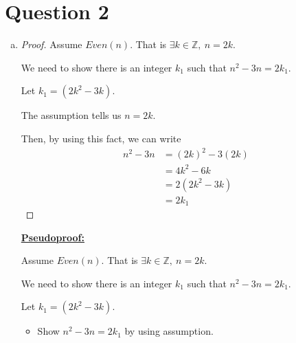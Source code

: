 \documentclass[12pt]{article}
\begin{document}
\section*{Question 2}
\begin{enumerate}[a.]
    \item

    \begin{proof}
        \bigskip

        Assume $Even(n)$. That is $\exists k \in \mathbb{Z},\:n = 2k$.

        \bigskip

        We need to show there is an integer $k_1$ such that $n^2 - 3n = 2k_1$.

        \bigskip

        Let $k_1 = (2k^2 - 3k)$.

        \bigskip

        The assumption tells us $n = 2k$.

        \bigskip

        Then, by using this fact, we can write
        \setcounter{equation}{0}
        \begin{align}
            n^2 - 3n &= (2k)^2 - 3(2k)\\
            &= 4k^2 - 6k\\
            &= 2(2k^2 - 3k)\\
            &= 2k_1
        \end{align}

    \end{proof}

    \bigskip

    \begin{mdframed}
        \underline{\textbf{Pseudoproof:}}

        \bigskip

        Assume $Even(n)$. That is $\exists k \in \mathbb{Z},\:n = 2k$.

        \bigskip

        We need to show there is an integer $k_1$ such that $n^2 - 3n = 2k_1$.

        \bigskip

        Let $k_1 = (2k^2 - 3k)$.

        \bigskip

        \begin{itemize}
            \item Show $n^2 - 3n = 2k_1$ by using assumption.

            \bigskip


\end{itemize}
\end{mdframed}
\end{enumerate}
\end{document}
